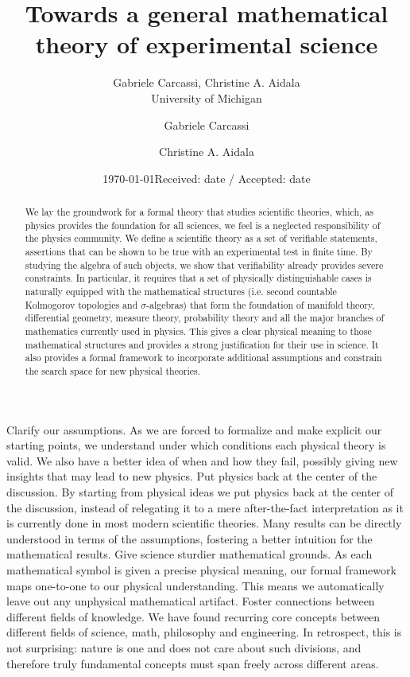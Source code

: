 \documentclass[letterpaper]{article}
\theoremstyle{plain}%
\theoremstyle{definition}
\theoremstyle{remark}
\numberwithin{equation}{section}
\begin{document}
\title{Towards a general mathematical theory of experimental science}


\ifarchive
\author{Gabriele Carcassi, Christine A. Aidala \\ University of Michigan}
\date{\today}
\else
\author{Gabriele Carcassi \and Christine A. Aidala}
\date{Received: date / Accepted: date}
\fi

\maketitle

\begin{abstract}
	We lay the groundwork for a formal theory that studies scientific theories, which, as physics provides the foundation for all sciences, we feel is a neglected responsibility of the physics community. We define a scientific theory as a set of verifiable statements, assertions that can be shown to be true with an experimental test in finite time. By studying the algebra of such objects, we show that verifiability already provides severe constraints. In particular, it requires that a set of physically distinguishable cases is naturally equipped with the mathematical structures (i.e. second countable Kolmogorov topologies and $\sigma$-algebras) that form the foundation of manifold theory, differential geometry, measure theory, probability theory and all the major branches of mathematics currently used in physics. This gives a clear physical meaning to those mathematical structures and provides a strong justification for their use in science. It also provides a formal framework to incorporate additional assumptions and constrain the search space for new physical theories.
\end{abstract}

Clarify our assumptions. As we are forced to formalize and make explicit our starting points, we understand under which conditions each physical theory is valid. We also have a better idea of when and how they fail, possibly giving new insights that may lead to new physics.
Put physics back at the center of the discussion. By starting from physical ideas we put physics back at the center of the discussion, instead of relegating it to a mere after-the-fact interpretation as it is currently done in most modern scientific theories. Many results can be directly understood in terms of the assumptions, fostering a better intuition for the mathematical results.
Give science sturdier mathematical grounds. As each mathematical symbol is given a precise physical meaning, our formal framework maps one-to-one to our physical understanding. This means we automatically leave out any unphysical mathematical artifact.
Foster connections between different fields of knowledge. We have found recurring core concepts between different fields of science, math, philosophy and engineering. In retrospect, this is not surprising: nature is one and does not care about such divisions, and therefore truly fundamental concepts must span freely across different areas.
\end{document}
